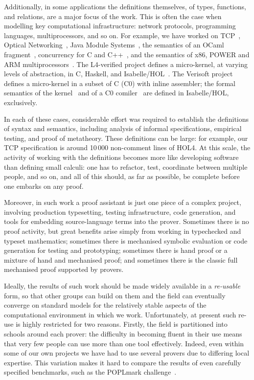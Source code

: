 \documentclass[a4paper]{llncs}
\begin{document}
Additionally, in some applications the definitions themselves, of types,
functions, and relations, are a major focus of the work.  This is often the case
when modelling key computational infrastructure: network protocols, programming
languages, multiprocessors, and so on.  For example, we have worked on
TCP~\cite{TCP:paper,RNS08}, Optical Networking~\cite{BDJRS06}, Java Module
Systems~\cite{ljam}, the semantics of an OCaml fragment~\cite{ocamllightesop},
concurrency for C and C++~\cite{C++,ppdp11,Ctso}, and the semantics of x86,
POWER and ARM multiprocessors~\cite{pldi11,x86popl}.  The L4-verified project
defines a micro-kernel, at varying levels of abstraction, in C, Haskell, and
Isabelle/HOL~\cite{l4-verif}.  The Verisoft project defines a micro-kernel in a
subset of C (C0) with inline assembler; the formal semantics of the
kernel~\cite{Alkassar:VSTTE2010} and of a C0 comiler~\cite{Leinenbach:SSV08} are
defined in Isabelle/HOL, exclusively.
 
In each of these cases, considerable effort was required to establish the
definitions of syntax and semantics, including analysis of informal
specifications, empirical testing, and proof of metatheory. These definitions
can be large: for example, our TCP specification is around 10\,000 non-comment
lines of HOL4.  At this scale, the activity of working with the definitions
becomes more like developing software than defining small calculi: one has to
refactor, test, coordinate between multiple people, and so on, and all of this
should, as far as possible, be complete before one embarks on any proof.

Moreover, in such work a proof assistant is just one piece of a complex project,
involving production typesetting, testing infrastructure, code generation, and
tools for embedding source-language terms into the prover.  Sometimes there is
no proof activity, but great benefits arise simply from working in typechecked
and typeset mathematics; sometimes there is mechanised symbolic evaluation or
code generation for testing and prototyping; sometimes there is hand proof or a
mixture of hand and mechanised proof; and sometimes there is the classic full
mechanised proof supported by provers.

Ideally, the results of such work should be made widely available in a
\emph{re-usable} form, so that other groups can build on them and 
the field can eventually converge on standard models for the
relatively stable aspects of the computational environment in which we
work.  Unfortunately, at present such re-use is highly restricted for two
reasons.
%
Firstly, the field is partitioned into schools around each prover: the
difficulty in becoming fluent in their use means that very few people
can use more than one tool effectively.  Indeed, even within some of our
own projects we have had to use several provers due to differing local
expertise.  This variation makes it hard to compare the results of even
carefully specified benchmarks, such as the POPLmark
challenge~\cite{poplmark}.
\end{document}
